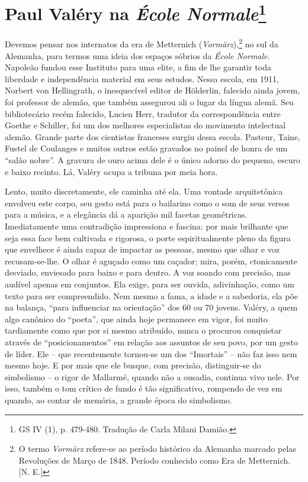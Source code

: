 \chapter{Paul Valéry na \emph{École Normale}\footnote[*]{GS IV (1), p. 479-480. Tradução de Carla Milani Damião.}}

Devemos pensar nos internatos da era de Metternich
(\emph{Vormärz}),\footnote{O termo \emph{Vormärz} refere-se ao período
  histórico da Alemanha marcado pelas Revoluções de Março de 1848.
  Período conhecido como Era de Metternich. {[}N. E.{]}} no sul da
Alemanha, para termos uma ideia dos espaços sóbrios da \emph{École
Normale}. Napoleão fundou esse Instituto para uma elite, a fim de lhe
garantir toda liberdade e independência material em seus estudos. Nessa
escola, em 1911, Norbert von Hellingrath, o inesquecível editor de
Hölderlin, falecido ainda jovem, foi professor de alemão, que também
assegurou ali o lugar da língua alemã. Seu bibliotecário recém falecido,
Lucien Herr, tradutor da correspondência entre Goethe e Schiller, foi um
dos melhores especialistas do movimento intelectual alemão. Grande parte
dos cientistas franceses surgiu dessa escola. Pasteur, Taine, Fustel de
Coulanges e muitos outros estão gravados no painel de honra de um
``salão nobre''. A gravura de ouro acima dele é o único adorno do
pequeno, escuro e baixo recinto. Lá, Valéry ocupa a tribuna por meia
hora.

Lento, muito discretamente, ele caminha até ela. Uma vontade
arquitetônica envolveu este corpo, seu gesto está para o bailarino como
o som de seus versos para a música, e a elegância dá a aparição mil
facetas geométricas. Imediatamente uma contradição impressiona e
fascina: por mais brilhante que seja essa face bem cultivada e rigorosa,
o porte espiritualmente pleno da figura que envelhece é ainda capaz de
impactar as pessoas, mesmo que olhar e voz recusam-se-lhe. O olhar é
aguçado como um caçador; mira, porém, ctonicamente desviado, enviesado
para baixo e para dentro. A voz soando com precisão, mas audível apenas
em conjuntos. Ela exige, para ser ouvida, adivinhação, como um texto
para ser compreendido. Nem mesmo a fama, a idade e a sabedoria, ela põe
na balança, ``para influenciar na orientação'' dos 60 ou 70 jovens.
Valéry, a quem algo canônico do ``poeta'', que ainda hoje permanece em
vigor, foi muito tardiamente como que por si mesmo atribuído, nunca o
procurou conquistar através de ``posicionamentos'' em relação aos
assuntos de seu povo, por um gesto de líder. Ele -- que recentemente
tornou-se um dos ``Imortais'' -- não faz isso nem mesmo hoje. E por mais
que ele busque, com precisão, distinguir-se do simbolismo -- o rigor de
Mallarmé, quando não a ousadia, continua vivo nele. Por isso, também o
tom crítico de fundo é tão significativo, rompendo de vez em quando, ao
contar de memória, a grande época do simbolismo.

